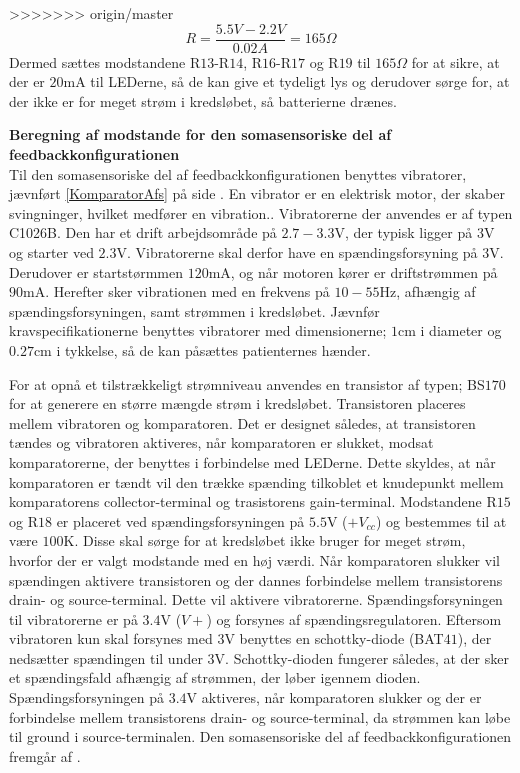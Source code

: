>>>>>>> origin/master
\begin{equation}
R = \dfrac{5.5V - 2.2V}{0.02A} = 165\Omega
\end{equation}
\noindent Dermed sættes modstandene R$13$-R$14$, R$16$-R$17$ og R$19$ til $165\Omega$ for at sikre, at der er $20$mA til LEDerne, så de kan give et tydeligt lys og derudover sørge for, at der ikke er for meget strøm i kredsløbet, så batterierne drænes. 


\noindent\textbf{Beregning af modstande for den somasensoriske del af feedbackkonfigurationen} \\
Til den somasensoriske del af feedbackkonfigurationen benyttes vibratorer, jævnført \ref{KomparatorAfs} på side \pageref{KomparatorAfs}. En vibrator er en elektrisk motor, der skaber svingninger, hvilket medfører en vibration.\cite{Radaktionen2009}. Vibratorerne der anvendes er af typen C1026B. Den har et drift arbejdsområde på $2.7-3.3$V, der typisk ligger på $3$V og starter ved $2.3$V. Vibratorerne skal derfor have en spændingsforsyning på $3$V. Derudover er startstørmmen $120$mA, og når motoren kører er driftstrømmen på $90$mA. Herefter sker vibrationen med en frekvens på $10-55$Hz, afhængig af spændingsforsyningen, samt strømmen i kredsløbet. \cite{Machinery2009} Jævnfør kravspecifikationerne benyttes vibratorer med dimensionerne; $1$cm i diameter og $0.27$cm i tykkelse, så de kan påsættes patienternes hænder. 
 
For at opnå et tilstrækkeligt strømniveau anvendes en transistor af typen; BS$170$ for at generere en større mængde strøm i kredsløbet. Transistoren placeres mellem vibratoren og komparatoren. Det er designet således, at transistoren tændes og vibratoren aktiveres, når komparatoren er slukket, modsat komparatorerne, der benyttes i forbindelse med LEDerne. Dette skyldes, at når komparatoren er tændt vil den trække spænding tilkoblet et knudepunkt mellem komparatorens collector-terminal og trasistorens gain-terminal. Modstandene R$15$ og R$18$ er placeret ved spændingsforsyningen på $5.5$V ($+V_{cc}$) og bestemmes til at være $100$K. Disse skal sørge for at kredsløbet ikke bruger for meget strøm, hvorfor der er valgt modstande med en høj værdi. Når komparatoren slukker vil spændingen aktivere transistoren og der dannes forbindelse mellem transistorens drain- og source-terminal. Dette vil aktivere vibratorerne. Spændingsforsyningen til vibratorerne er på $3.4$V ($V+$) og forsynes af spændingsregulatoren. Eftersom vibratoren kun skal forsynes med $3$V benyttes en schottky-diode (BAT$41$), der nedsætter spændingen til under $3$V. Schottky-dioden fungerer således, at der sker et spændingsfald afhængig af strømmen, der løber igennem dioden. Spændingsforsyningen på $3.4$V aktiveres, når komparatoren slukker og der er forbindelse mellem transistorens drain- og source-terminal, da strømmen kan løbe til ground i source-terminalen. Den somasensoriske del af feedbackkonfigurationen fremgår af .
 
